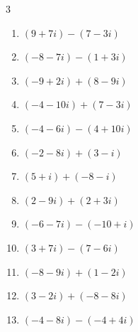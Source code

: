 \begin{multicols}{3}
\begin{enumerate}
  \item $\displaystyle (9+7i) - (7-3i)$

        \phantom{$\displaystyle =2+10i$}

  \item $\displaystyle (-8-7i) - (1+3i)$

        \phantom{$\displaystyle =-9-10i$}

  \item $\displaystyle (-9+2i) + (8-9i)$

        \phantom{$\displaystyle =-1-7i$}

  \item $\displaystyle (-4-10i) + (7-3i)$

        \phantom{$\displaystyle =3-13i$}

  \item $\displaystyle (-4-6i) - (4+10i)$

        \phantom{$\displaystyle =-8-16i$}

  \item $\displaystyle (-2-8i) + (3-i)$

        \phantom{$\displaystyle =1-9i$}

  \item $\displaystyle (5+i) + (-8-i)$

        \phantom{$\displaystyle =-3$}

  \item $\displaystyle (2-9i) + (2+3i)$

        \phantom{$\displaystyle =4-6i$}

  \item $\displaystyle (-6-7i) - (-10+i)$

        \phantom{$\displaystyle =4-8i$}

  \item $\displaystyle (3+7i) - (7-6i)$

        \phantom{$\displaystyle =-4+13i$}

  \item $\displaystyle (-8-9i) + (1-2i)$

        \phantom{$\displaystyle =-7-11i$}

  \item $\displaystyle (3-2i) + (-8-8i)$

        \phantom{$\displaystyle =-5-10i$}

\columnbreak %

  \item $\displaystyle (-4-8i) - (-4+4i)$


\end{enumerate}
\end{multicols}
